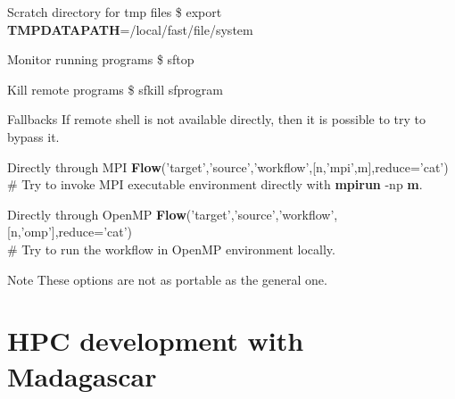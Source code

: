 \begin{frame}
  \begin{block}{Scratch directory for tmp files}
    \$ export {\bf TMPDATAPATH}=/local/fast/file/system
  \end{block}
  \begin{block}{Monitor running programs}
    \$ sftop
  \end{block}
  \begin{block}{Kill remote programs}
    \$ sfkill sfprogram
  \end{block}
\end{frame}

\begin{frame}
  \begin{block}{Fallbacks}
    If remote shell is not available directly, then it is possible to try to
    bypass it.
  \end{block}
  \begin{block}{Directly through MPI}
    {\bf Flow}('target','source','workflow',[n,'mpi',m],reduce='cat') \\
    \# Try to invoke MPI executable environment directly with {\bf mpirun} -np
    {\bf m}.
  \end{block}
  \begin{block}{Directly through OpenMP}
    {\bf Flow}('target','source','workflow',[n,'omp'],reduce='cat') \\
    \# Try to run the workflow in OpenMP environment locally.
  \end{block}
  \begin{block}{Note}
    These options are not as portable as the general one.
  \end{block}
\end{frame}

\section{HPC development with Madagascar}

